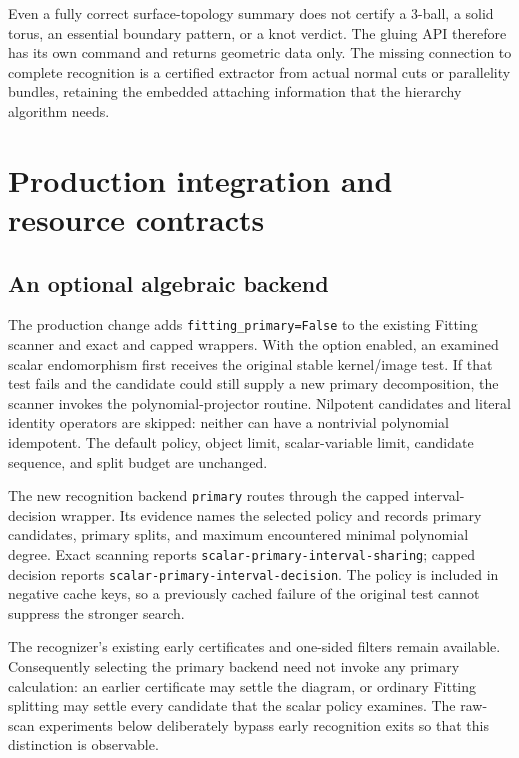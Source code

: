 \documentclass[11pt,a4paper]{article}
\theoremstyle{definition}\newtheorem{definition}[theorem]{Definition}
\theoremstyle{remark}\newtheorem{remark}[theorem]{Remark}
\newcommand{\code}[1]{\nolinkurl{#1}}
\begin{document}
Even a fully correct surface-topology summary does not certify a 3-ball,
a solid torus, an essential boundary pattern, or a knot verdict. The gluing
API therefore has its own command and returns geometric data only. The
missing connection to complete recognition is a certified extractor from
actual normal cuts or parallelity bundles, retaining the embedded attaching
information that the hierarchy algorithm needs.

\section{Production integration and resource contracts}
\label{sec:integration}

\subsection{An optional algebraic backend}

The production change adds \code{fitting_primary=False} to the existing
Fitting scanner and exact and capped wrappers. With the option enabled,
an examined scalar endomorphism first receives the original stable
kernel/image test. If that test fails and the candidate could still supply
a new primary decomposition, the scanner invokes the polynomial-projector
routine. Nilpotent candidates and literal identity operators are skipped:
neither can have a nontrivial polynomial idempotent. The default policy,
object limit, scalar-variable limit, candidate sequence, and split budget
are unchanged.

The new recognition backend \code{primary} routes through the capped
interval-decision wrapper. Its evidence names the selected policy and
records primary candidates, primary splits, and maximum encountered minimal
polynomial degree. Exact scanning reports
\code{scalar-primary-interval-sharing}; capped decision reports
\code{scalar-primary-interval-decision}. The policy is included in negative
cache keys, so a previously cached failure of the original test cannot
suppress the stronger search.

The recognizer's existing early certificates and one-sided filters remain
available. Consequently selecting the primary backend need not invoke any
primary calculation: an earlier certificate may settle the diagram, or
ordinary Fitting splitting may settle every candidate that the scalar
policy examines. The raw-scan experiments below deliberately bypass early
recognition exits so that this distinction is observable.
\end{document}
